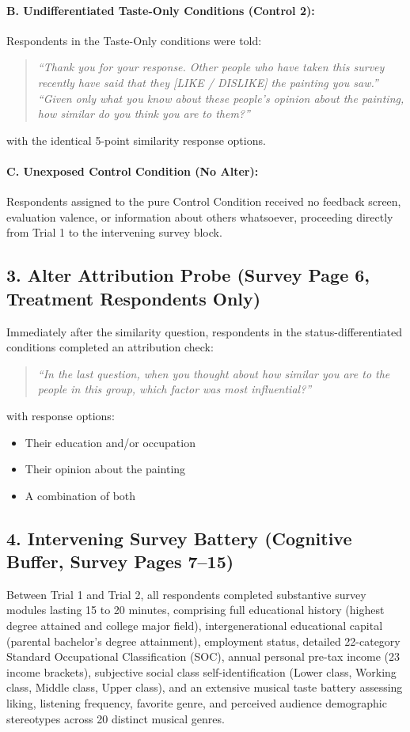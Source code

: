 \documentclass[12pt, letterpaper]{article}
\begin{document}
\paragraph{B. Undifferentiated Taste-Only Conditions (Control 2):}
Respondents in the Taste-Only conditions were told:
\begin{quote}
\textit{``Thank you for your response. Other people who have taken this survey recently have said that they [LIKE / DISLIKE] the painting you saw.''} \\[4pt]
\textit{``Given only what you know about these people's opinion about the painting, how similar do you think you are to them?''}
\end{quote}
with the identical 5-point similarity response options.

\paragraph{C. Unexposed Control Condition (No Alter):}
Respondents assigned to the pure Control Condition received no feedback screen, evaluation valence, or information about others whatsoever, proceeding directly from Trial 1 to the intervening survey block.

\subsection*{3. Alter Attribution Probe (Survey Page 6, Treatment Respondents Only)}
Immediately after the similarity question, respondents in the status-differentiated conditions completed an attribution check:
\begin{quote}
\textit{``In the last question, when you thought about how similar you are to the people in this group, which factor was most influential?''}
\end{quote}
with response options:
\begin{itemize}
    \item Their education and/or occupation
    \item Their opinion about the painting
    \item A combination of both
\end{itemize}

\subsection*{4. Intervening Survey Battery (Cognitive Buffer, Survey Pages 7--15)}
Between Trial 1 and Trial 2, all respondents completed substantive survey modules lasting 15 to 20 minutes, comprising full educational history (highest degree attained and college major field), intergenerational educational capital (parental bachelor's degree attainment), employment status, detailed 22-category Standard Occupational Classification (SOC), annual personal pre-tax income (23 income brackets), subjective social class self-identification (Lower class, Working class, Middle class, Upper class), and an extensive musical taste battery assessing liking, listening frequency, favorite genre, and perceived audience demographic stereotypes across 20 distinct musical genres.
\end{document}
